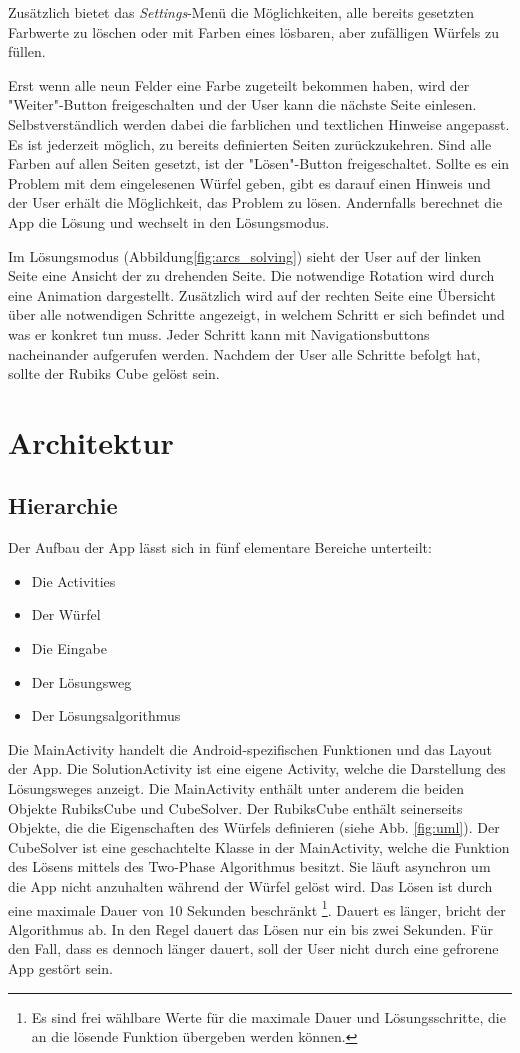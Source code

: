 Zusätzlich bietet das \emph{Settings}-Menü die Möglichkeiten, alle bereits
gesetzten Farbwerte zu löschen oder mit Farben eines lösbaren, aber zufälligen
Würfels zu füllen.

Erst wenn alle neun Felder eine Farbe zugeteilt bekommen haben, wird der
"Weiter"-Button freigeschalten und der User kann die nächste Seite einlesen.
Selbstverständlich werden dabei die farblichen und textlichen Hinweise
angepasst. Es ist jederzeit möglich, zu bereits definierten Seiten
zurückzukehren. Sind alle Farben auf allen Seiten gesetzt, ist der
"Lösen"-Button freigeschaltet. Sollte es ein Problem mit dem eingelesenen Würfel
geben, gibt es darauf einen Hinweis und der User erhält die Möglichkeit, das
Problem zu lösen. Andernfalls berechnet die App die Lösung und wechselt in den
Lösungsmodus.

Im Lösungsmodus (Abbildung\ref{fig:arcs_solving}) sieht der User auf der linken
Seite eine Ansicht der zu drehenden Seite. Die notwendige Rotation wird durch
eine Animation dargestellt. Zusätzlich wird auf der rechten Seite eine Übersicht
über alle notwendigen Schritte angezeigt, in welchem Schritt er sich befindet
und was er konkret tun muss. Jeder Schritt kann mit Navigationsbuttons
nacheinander aufgerufen werden. Nachdem der User alle Schritte befolgt hat,
sollte der Rubiks Cube gelöst sein.

\section{Architektur}  %

\subsection{Hierarchie}  %
Der Aufbau der App lässt sich in fünf elementare Bereiche unterteilt:
\begin{itemize}
	\item Die Activities
	\item Der Würfel
	\item Die Eingabe
	\item Der Lösungsweg
	\item Der Lösungsalgorithmus
\end{itemize}
Die MainActivity handelt die Android-spezifischen Funktionen und das Layout der
App. Die SolutionActivity ist eine eigene Activity, welche die Darstellung des
Lösungsweges anzeigt.
Die MainActivity enthält unter anderem die beiden Objekte RubiksCube und CubeSolver.
Der RubiksCube enthält seinerseits Objekte, die die Eigenschaften des Würfels
definieren (siehe Abb. \ref{fig:uml}).
Der CubeSolver ist eine geschachtelte Klasse in der MainActivity, welche die Funktion des Lösens mittels
des Two-Phase Algorithmus besitzt. Sie läuft asynchron um die App nicht anzuhalten
während der Würfel gelöst wird. Das Lösen ist durch eine maximale Dauer von 10 Sekunden beschränkt
\footnote{Es sind frei wählbare Werte für die maximale Dauer und Lösungsschritte, die an die lösende Funktion
übergeben werden können.}.
Dauert es länger, bricht der Algorithmus ab. In den Regel dauert das Lösen nur ein bis zwei Sekunden.
Für den Fall, dass es dennoch länger dauert, soll der User nicht durch eine gefrorene App gestört sein.

